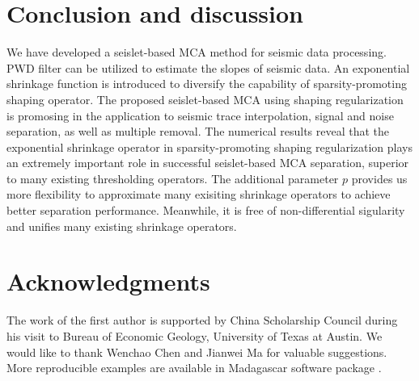 

  
\section{Conclusion and discussion}

We have developed a seislet-based MCA method for seismic data processing. PWD filter can be utilized to estimate the slopes of seismic data. An exponential shrinkage function is introduced to diversify the capability of sparsity-promoting shaping operator. The proposed seislet-based MCA using shaping regularization is promosing in the application to seismic trace interpolation, signal and noise separation, as well as multiple removal. The numerical results reveal that the exponential shrinkage operator in sparsity-promoting shaping regularization plays an extremely important role in successful seislet-based MCA separation, superior to many existing thresholding operators. The additional parameter $p$ provides us more flexibility to approximate many exisiting shrinkage operators to achieve better separation performance. Meanwhile, it is free of non-differential sigularity and unifies many existing shrinkage operators. 



\section*{Acknowledgments}

The work of the first author is supported by China Scholarship Council during his visit to Bureau of Economic Geology, University of Texas at Austin. We would like to thank Wenchao Chen and Jianwei Ma for valuable suggestions. More reproducible examples are available in  Madagascar software package \citep{m8r}.

